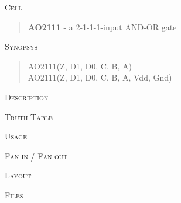 
\label{AO2111}
\textsc{Cell}
\begin{quote}
    \textbf{AO2111} - a 2-1-1-1-input AND-OR gate
\end{quote}

\textsc{Synopsys}
\begin{quote}
    AO2111(Z, D1, D0, C, B, A) \\
    AO2111(Z, D1, D0, C, B, A, Vdd, Gnd)
\end{quote}

\textsc{Description}

%

\textsc{Truth Table}


\textsc{Usage}

\textsc{Fan-in / Fan-out}

\textsc{Layout}

\textsc{Files}

